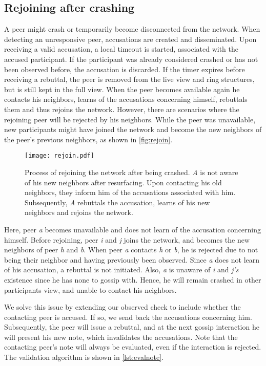 \documentclass[USenglish]{uit-thesis}
\begin{document}
\subsection{Rejoining after crashing}
A peer might crash or temporarily become disconnected from the network. 
When detecting an unresponsive peer, accusations are created and disseminated.
Upon receiving a valid accusation, a local timeout is started, associated with the accused participant.
If the participant was already considered crashed or has not been observed before, the accusation is discarded.
If the timer expires before receiving a rebuttal, the peer is removed from the live view and ring structures, but is still kept in the full view.
When the peer becomes available again he contacts his neighbors, learns of the accusations concerning himself, rebuttals them and thus rejoins the network.
However, there are scenarios where the rejoining peer will be rejected by his neighbors.
While the peer was unavailable, new participants might have joined the network and become the new neighbors of the peer's previous neighbors, as shown in \autoref{fig:rejoin}.
\begin{figure}[h]
	\centering
	\texttt{[image: rejoin.pdf]}
	\caption{Process of rejoining the network after being crashed. \textit{A} is not aware of his new neighbors after resurfacing. Upon contacting his old neighbors, they inform him of the accusations associated with him. Subsequently, \textit{A} rebuttals the accusation, learns of his new neighbors and rejoins the network.}
	\label{fig:rejoin}
\end{figure} 
Here, peer \textit{a} becomes unavailable and does not learn of the accusation concerning himself.
Before rejoining, peer \textit{i} and \textit{j} joins the network, and becomes the new neighbors of peer \textit{h} and \textit{b}.
When peer \textit{a} contacts \textit{h} or \textit{b}, he is rejected due to not being their neighbor and having previously been observed.
Since \textit{a} does not learn of his accusation, a rebuttal is not initiated.
Also, \textit{a} is unaware of \textit{i} and \textit{j's} existence since he has none to gossip with.
Hence, he will remain crashed in other participants view, and unable to contact his neighbors.

We solve this issue by extending our observed check to include whether the contacting peer is accused. If so, we send back the accusations concerning him.
Subsequently, the peer will issue a rebuttal, and at the next gossip interaction he will present his new note, which invalidates the accusations.
Note that the contacting peer's note will always be evaluated, even if the interaction is rejected. 
The validation algorithm is shown in \autoref{lst:evalnote}.
\end{document}
